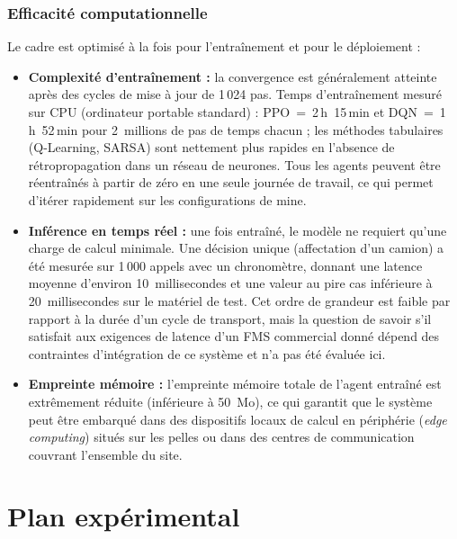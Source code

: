 \documentclass[11pt,a4paper]{article}
\begin{document}
\subsubsection{Efficacité computationnelle}

Le cadre est optimisé à la fois pour l'entraînement et pour le déploiement :

\begin{itemize}
  \item \textbf{Complexité d'entraînement :} la convergence est généralement atteinte après des cycles de mise à jour de 1\,024 pas. Temps d'entraînement mesuré sur CPU (ordinateur portable standard) : PPO~=~2\,h~15\,min et DQN~=~1\,h~52\,min pour 2~millions de pas de temps chacun ; les méthodes tabulaires (Q-Learning, SARSA) sont nettement plus rapides en l'absence de rétropropagation dans un réseau de neurones. Tous les agents peuvent être réentraînés à partir de zéro en une seule journée de travail, ce qui permet d'itérer rapidement sur les configurations de mine.
  \item \textbf{Inférence en temps réel :} une fois entraîné, le modèle ne requiert qu'une charge de calcul minimale. Une décision unique (affectation d'un camion) a été mesurée sur 1\,000 appels avec un chronomètre, donnant une latence moyenne d'environ 10~millisecondes et une valeur au pire cas inférieure à 20~millisecondes sur le matériel de test. Cet ordre de grandeur est faible par rapport à la durée d'un cycle de transport, mais la question de savoir s'il satisfait aux exigences de latence d'un FMS commercial donné dépend des contraintes d'intégration de ce système et n'a pas été évaluée ici.
  \item \textbf{Empreinte mémoire :} l'empreinte mémoire totale de l'agent entraîné est extrêmement réduite (inférieure à 50~Mo), ce qui garantit que le système peut être embarqué dans des dispositifs locaux de calcul en périphérie (\textit{edge computing}) situés sur les pelles ou dans des centres de communication couvrant l'ensemble du site.
\end{itemize}

\section{Plan expérimental}
\label{sec:design}
\end{document}
